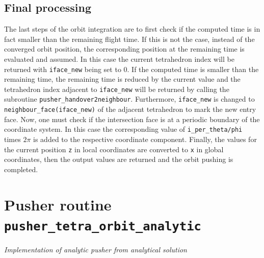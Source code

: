 \documentclass[./main.tex]{subfiles}
\begin{document}
\subsection{Final processing}
The last steps of the orbit integration are to first check if the computed time is in fact smaller than the remaining flight time. If this is not the case, instead of the converged orbit position, the corresponding position at the remaining time is evaluated and assumed. In this case the current tetrahedron index will be returned with \texttt{iface\_new} being set to 0. If the computed time is smaller than the remaining time, the remaining time is reduced by the current value and the tetrahedron index adjacent to \texttt{iface\_new} will be returned by calling the subroutine \texttt{pusher\_handover2neighbour}. Furthermore, \texttt{iface\_new} is changed to \texttt{neighbour\_face(iface\_new)} of the adjacent tetrahedron to mark the new entry face. Now, one must check if the intersection face is at a periodic boundary of the coordinate system. In this case the corresponding value of \texttt{i\_per\_theta/phi} times $2\pi$ is added to the respective coordinate component. Finally, the values for the current position \texttt{z} in local coordinates are converted to \texttt{x} in global coordinates, then the output values are returned and the orbit pushing is completed.

\section{Pusher routine \texttt{pusher\_tetra\_orbit\_analytic}}
\label{sec:AnalyticPusher}

\emph{Implementation of analytic pusher from analytical solution}
\newpage
\end{document}
